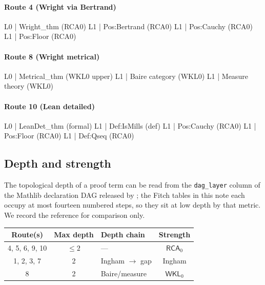 \documentclass[11pt,reqno]{amsart}
\theoremstyle{redplain}
\numberwithin{equation}{section}
\begin{document}
\paragraph{Route 4 (Wright via Bertrand)}
\begin{verbatimbox}
L0 | Wright_thm                         (RCA0)
L1 |   Pos:Bertrand                     (RCA0)
L1 |   Pos:Cauchy                       (RCA0)
L1 |   Pos:Floor                        (RCA0)
\end{verbatimbox}

\paragraph{Route 8 (Wright metrical)}
\begin{verbatimbox}
L0 | Metrical_thm                       (WKL0 upper)
L1 |   Baire category                   (WKL0)
L1 |   Measure theory                   (WKL0)
\end{verbatimbox}

\paragraph{Route 10 (Lean detailed)}
\begin{verbatimbox}
L0 | LeanDet_thm                        (formal)
L1 |   Def:IsMills                      (def)
L1 |   Pos:Cauchy                       (RCA0)
L1 |   Pos:Floor                        (RCA0)
L1 |   Def:Qseq                         (RCA0)
\end{verbatimbox}

\subsection{Depth and strength}

The topological depth of a proof term can be read from the
\texttt{dag\_layer} column of the Mathlib declaration DAG released by
\cite{MathlibGraph}; the Fitch tables in this note each occupy at most
fourteen numbered steps, so they sit at low depth by that metric. We
record the reference for comparison only.

\begin{center}
{\small
\begin{tabular}{|c|c|m{3.4cm}|c|}
\hline
\textbf{Route(s)} & \textbf{Max depth} & \textbf{Depth chain} & \textbf{Strength}\\
\hline
4, 5, 6, 9, 10 & $\le2$ & --- & $\mathsf{RCA}_0$ \\
\hline
1, 2, 3, 7    & 2      & Ingham $\to$ gap & Ingham \\
\hline
8              & 2      & Baire/measure & $\mathsf{WKL}_0$ \\
\hline
\end{tabular}
}
\end{center}
\end{document}
